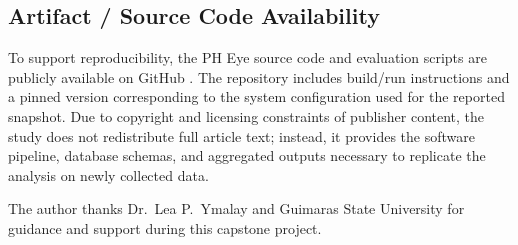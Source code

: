 \documentclass[sigconf, nonacm]{acmart}
\begin{document}
\subsection{Artifact / Source Code Availability}
To support reproducibility, the PH Eye source code and evaluation scripts are publicly available on GitHub \cite{pheye_github}. The repository includes build/run instructions and a pinned version corresponding to the system configuration used for the reported snapshot. Due to copyright and licensing constraints of publisher content, the study does not redistribute full article text; instead, it provides the software pipeline, database schemas, and aggregated outputs necessary to replicate the analysis on newly collected data.

\begin{acks}
The author thanks Dr.\ Lea P.\ Ymalay and Guimaras State University for guidance and support during this capstone project.
\end{acks}



\end{document}
